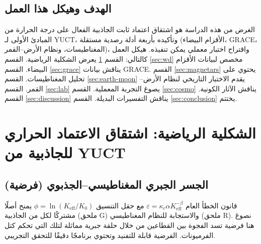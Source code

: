\documentclass[11pt,a4paper]{article}
\newcommand{\Keff}{K_{\mathrm{eff}}}
\newcommand{\kappac}{\kappa_c}
\begin{document}
	\subsection{الهدف وهيكل هذا العمل}
	\label{subsec:purpose}
	
	الغرض من هذه الدراسة هو اشتقاق اعتماد ثابت الجاذبية الفعال على درجة الحرارة من المبادئ الأولى لـ YUCT، وتأكيده بأربعة أدلة رصدية مستقلة (الأقزام البيضاء، GRACE، المغناطيسات، ونظام الأرض–القمر)، واقتراح اختبار معملي يمكن تنفيذه. هيكل العمل كالتالي: القسم \ref{sec:math} يعرض الشكلية الرياضية. القسم \ref{sec:wd} مخصص لبيانات الأقزام البيضاء. القسم \ref{sec:grace} يناقش بيانات GRACE. القسم \ref{sec:magnetars} يحتوي على تحليل المغناطيسات. القسم \ref{sec:earth-moon} يقدم الاختبار التاريخي لنظام الأرض–القمر. القسم \ref{sec:lab} يصوغ التجربة المعملية. القسم \ref{sec:cosmo} يناقش الآثار الكونية. القسم \ref{sec:discussion} يناقش التفسيرات البديلة. القسم \ref{sec:conclusion} يختتم.
	
	\section{الشكلية الرياضية: اشتقاق الاعتماد الحراري للجاذبية من YUCT}
	\label{sec:math}
	
	\subsection{الجسر الجبري المغناطيسي–الجذبوي (فرضية)}
	\label{subsec:magnetism-bridge}
	
	قانون الخطأ العام $\varepsilon = \kappac \alpha \Keff^{-\beta}$ مع حقل التنسيق $\phi = \ln(\Keff/K_0)$ يمنح أصلًا مشتركًا لكل من الجاذبية (ملحق G) والاستجابة للنظام المغناطيسي (ملحق R).  
	نصوغ هنا فرضية تسد الفجوة بين القطاعين من خلال حلقة جبرية مماثلة لتلك التي تحكم كتل الفرميونات.  
	الفرضية قابلة للتفنيد وتحتوي برنامجًا دقيقًا للتحقق التجريبي.
	
\end{document}
